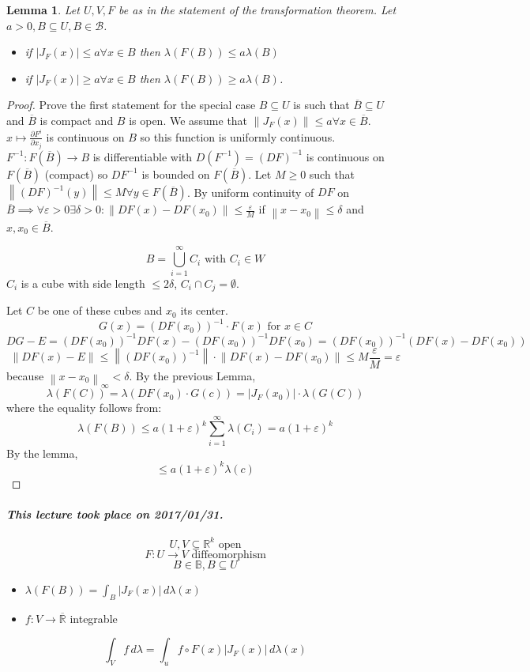 \documentclass{article}
\newtheorem{lemma}{Lemma}  \numberwithin{lemma}{section}
\newcommand{\norm}[1]{\left\|#1\right\|}
\newcommand{\card}[1]{\left|#1\right|}
\newcommand{\dateref}[1]{\paragraph{\textit{This lecture took place on #1.}}}
\begin{document}
\begin{lemma}
  Let $U, V, F$ be as in the statement of the transformation theorem.
  Let $a > 0, B \subseteq U, B \in \mathcal B$.
  \begin{itemize}
    \item if $\card{J_F(x)} \leq a \forall x \in B$ then $\lambda(F(B)) \leq a \lambda(B)$
    \item if $\card{J_F(x)} \geq a \forall x \in B$ then $\lambda(F(B)) \geq a \lambda(B)$.
  \end{itemize}
\end{lemma}
\begin{proof}
  Prove the first statement for the special case $B \subseteq U$ is such that $\overline{B} \subseteq U$ and $\overline{B}$ is compact and $B$ is open.
  We assume that $\norm{J_F(x)} \leq a \forall x \in \overline{B}$.
  $x \mapsto \frac{\partial F^i}{\partial x_j}$ is continuous on $B$ so this function is uniformly continuous.
  $F^{-1}: F(\overline{B}) \to B$ is differentiable with $D(F^{-1}) = (DF)^{-1}$ is continuous on $F(\overline{B})$ (compact) so $DF^{-1}$ is bounded on $F(\overline{B})$.
  Let $M \geq 0$ such that $\norm{(DF)^{-1}(y)} \leq M \forall y \in F(\overline{B})$.
  By uniform continuity of $DF$ on $\overline{B} \implies \forall \varepsilon > 0 \exists \delta > 0: \norm{DF(x) - DF(x_0)} \leq \frac{\varepsilon}{M}$ if $\norm{x - x_0} \leq \delta$ and $x, x_0 \in \overline{B}$.

  \[ B = \bigcup_{i=1}^\infty C_i \text{ with } C_i \in W \]
  $C_i$ is a cube with side length $\leq 2\delta$, $C_i \cap C_j = \emptyset$.

  Let $C$ be one of these cubes and $x_0$ its center.
  \[ G(x) = (DF(x_0))^{-1} \cdot F(x) \text{ for } x \in C \]
  \[ DG - E = (DF(x_0))^{-1} DF(x) - (DF(x_0))^{-1} DF(x_0) = (DF(x_0))^{-1} (DF(x) - DF(x_0)) \]
  \[ \norm{DF(x) - E} \leq \norm{(DF(x_0))^{-1}} \cdot \norm{DF(x) - DF(x_0)} \leq M \frac{\varepsilon}{M} = \varepsilon \]
  because $\norm{x - x_0}_{\infty} < \delta$.
  By the previous Lemma,
  \[ \lambda(F(C)) = \lambda(DF(x_0) \cdot G(c)) = \card{J_F(x_0)} \cdot \lambda(G(C)) \]
  where the equality follows from:
  \[ \lambda(F(B)) \leq a (1 + \varepsilon)^k \sum_{i=1}^\infty \lambda (C_i) = a(1 + \varepsilon)^k \]
  By the lemma,
  \[ \leq a (1 + \varepsilon)^k \lambda(c) \]
\end{proof}

\dateref{2017/01/31}

\[ U, V \subseteq \mathbb R^k \text{ open} \]
\[ F: U \to V \text{ diffeomorphism} \]
\[ B \in \mathbb B, B \subseteq U \]
\begin{itemize}
  \item $\lambda(F(B)) = \int_B \card{J_F(x)} \, d\lambda(x)$
  \item $f: V \to \overline{\mathbb R}$ integrable
\end{itemize}
\[ \int_V f \, d\lambda = \int_u f \circ F(x) \card{J_F(x)} \, d\lambda(x) \]
\end{document}
